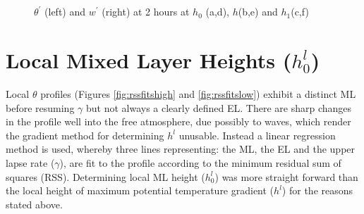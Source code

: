 \begin{figure}[htbp]
\caption{$\theta^{'}$ (left) and $w^{'}$ (right) at 2 hours at $h_{0}$ (a,d), $h$(b,e) and $h_{1}$(c,f)}
\begin{minipage}[b]{0.5\linewidth} 
        
        \\
        \\ 
 \end{minipage}             
\quad
\begin{minipage}[b]{0.5\linewidth}
        \\
       
       \\
        
\end{minipage}
        
        \label{fig:conts1}
\end{figure}

\clearpage


\section{Local Mixed Layer Heights ($h_{0}^{l}$)}
\label{sec:locmlh}     
\FloatBarrier

Local $\theta$ profiles (Figures \ref{fig:rssfitshigh} and \ref{fig:rssfitslow}) exhibit a distinct 
\acs{ML} before resuming $\gamma$ but 
not always a clearly defined \acs{EL}.  There are sharp changes in the profile well into the free 
atmosphere, due possibly to waves, which render the gradient method for determining $h^{l}$ 
unusable.  Instead a linear regression method is used, whereby three lines representing: the
 \acs{ML}, the \acs{EL} and the upper lapse rate ($\gamma$), are fit to the profile according 
to the minimum residual sum of squares (RSS).  Determining local \acs{ML} height ($h_{0}^{l}$) was 
more straight forward than the local height of maximum potential temperature gradient 
($h^{l}$) for the reasons stated above.\\  

